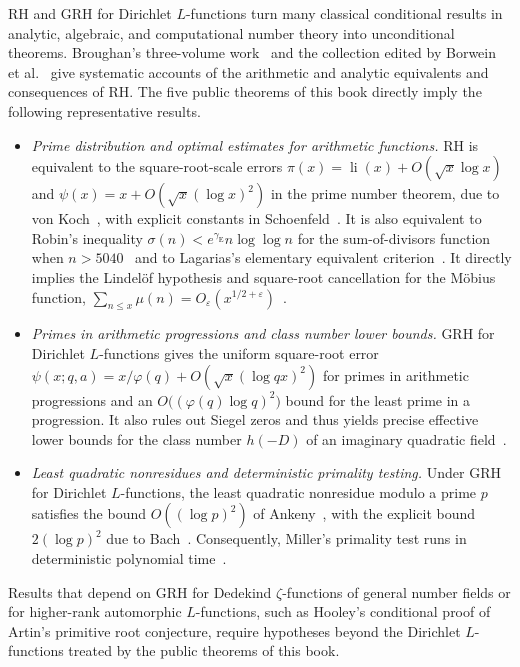 RH and GRH for Dirichlet $L$-functions turn many classical conditional results in analytic, algebraic, and computational number theory into unconditional theorems. Broughan's three-volume work~\cite{Broughan2017a,Broughan2017b,Broughan2023} and the collection edited by Borwein et al.~\cite{BorweinEtAl2008} give systematic accounts of the arithmetic and analytic equivalents and consequences of RH. The five public theorems of this book directly imply the following representative results.
\begin{itemize}
\item \emph{Prime distribution and optimal estimates for arithmetic functions.} RH is equivalent to the square-root-scale errors $\pi(x)=\operatorname{li}(x)+O(\sqrt{x}\log x)$ and $\psi(x)=x+O(\sqrt{x}(\log x)^2)$ in the prime number theorem, due to von Koch~\cite{vonKoch1901}, with explicit constants in Schoenfeld~\cite{Schoenfeld1976}. It is also equivalent to Robin's inequality $\sigma(n)<e^{\gamma_{\mathrm E}}n\log\log n$ for the sum-of-divisors function when $n>5040$~\cite{Robin1984} and to Lagarias's elementary equivalent criterion~\cite{Lagarias2002}. It directly implies the Lindelöf hypothesis and square-root cancellation for the Möbius function, $\sum_{n\le x}\mu(n)=O_\varepsilon(x^{1/2+\varepsilon})$~\cite{Titchmarsh1986,IwaniecKowalski2004}.
\item \emph{Primes in arithmetic progressions and class number lower bounds.} GRH for Dirichlet $L$-functions gives the uniform square-root error $\psi(x;q,a)=x/\varphi(q)+O(\sqrt{x}(\log qx)^2)$ for primes in arithmetic progressions and an $O\bigl((\varphi(q)\log q)^2\bigr)$ bound for the least prime in a progression. It also rules out Siegel zeros and thus yields precise effective lower bounds for the class number $h(-D)$ of an imaginary quadratic field~\cite{Davenport2000,IwaniecKowalski2004,MontgomeryVaughan2007}.
\item \emph{Least quadratic nonresidues and deterministic primality testing.} Under GRH for Dirichlet $L$-functions, the least quadratic nonresidue modulo a prime $p$ satisfies the bound $O((\log p)^2)$ of Ankeny~\cite{Ankeny1952}, with the explicit bound $2(\log p)^2$ due to Bach~\cite{Bach1990}. Consequently, Miller's primality test runs in deterministic polynomial time~\cite{Miller1976,Bach1990}.
\end{itemize}
Results that depend on GRH for Dedekind $\zeta$-functions of general number fields or for higher-rank automorphic $L$-functions, such as Hooley's conditional proof of Artin's primitive root conjecture, require hypotheses beyond the Dirichlet $L$-functions treated by the public theorems of this book.


